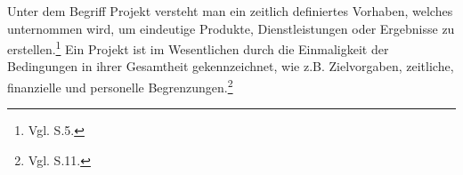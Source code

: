 Unter dem Begriff Projekt versteht man ein zeitlich definiertes Vorhaben, welches unternommen wird,
um eindeutige Produkte, Dienstleistungen oder Ergebnisse zu erstellen.\footnote{Vgl. \cite{ProjectManagementInstitute.2008} S.5.}
Ein Projekt ist im Wesentlichen durch die Einmaligkeit der Bedingungen in ihrer Gesamtheit gekennzeichnet, wie z.B. Zielvorgaben, zeitliche, finanzielle und personelle Begrenzungen.\footnote{Vgl. \cite{DIN.200901} S.11.}